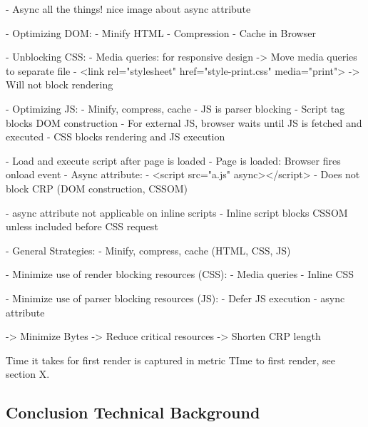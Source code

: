 - Async all the things! nice image about async attribute


- Optimizing DOM:
	- Minify HTML
	- Compression
	- Cache in Browser


- Unblocking CSS:
	- Media queries: for responsive design
	-> Move media queries to separate file
	- <link rel="stylesheet" href="style-print.css" media="print">
	-> Will not block rendering


- Optimizing JS:
	- Minify, compress, cache
	- JS is parser blocking
	- Script tag blocks DOM construction
	- For external JS, browser waits until JS is fetched and executed
	- CSS blocks rendering and JS execution

	- Load and execute script after page is loaded
	- Page is loaded: Browser fires onload event
	- Async attribute:
		- <script src="a.js" async></script>
		- Does not block CRP (DOM construction, CSSOM)

	- async attribute not applicable on inline scripts
	- Inline script blocks CSSOM unless included before CSS request


- General Strategies:
	- Minify, compress, cache (HTML, CSS, JS)

	- Minimize use of render blocking resources (CSS):
		- Media queries
		- Inline CSS

	- Minimize use of parser blocking resources (JS):
		- Defer JS execution
		- async attribute


	-> Minimize Bytes
	-> Reduce critical resources
	-> Shorten CRP length







Time it takes for first render is captured in metric TIme to first render, see section X.













\subsection{Conclusion Technical Background}

